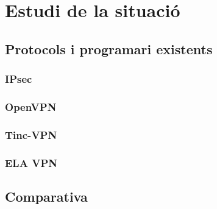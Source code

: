 \chapter{Estudi de la situació}
\section{Protocols i programari existents}
\subsection{IPsec}
\subsection{OpenVPN}
\subsection{Tinc-VPN}
\subsection{ELA VPN}
\section{Comparativa}
